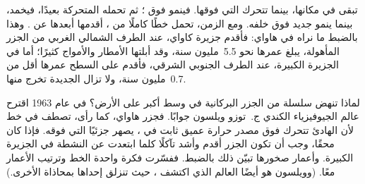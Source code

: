 تبقى  في مكانها، بينما تتحرك  التي فوقها. فينمو 
فوق ؛ ثم تحمله  المتحركة بعيدًا، فيخمد،
بينما ينمو  جديد فوق  خلفه. ومع الزمن، تحمل
 خطًا كاملًا من ، أقدمها أبعدها عن
. وهذا بالضبط ما نراه في هاواي: فأقدم 
جزيرة كاواي، عند الطرف الشمالي الغربي من الجزر المأهولة، يبلغ عمرها نحو
5.5~مليون سنة، وقد أبلتها الأمطار والأمواج كثيرًا؛ أما في الجزيرة
الكبيرة، عند الطرف الجنوبي الشرقي، فأقدم  على السطح عمرها أقل
من 0.7~مليون سنة، ولا تزال  الجديدة تخرج منها.

\begin{history}
لماذا تنهض سلسلة من الجزر البركانية في وسط أكبر
 على الأرض؟ في عام 1963 اقترح عالم الجيوفيزياء الكندي ج.~توزو ويلسون
جوابًا. فجزر هاواي، كما رأى، تصطف في خط لأن
  الهادئ تتحرك فوق مصدر حرارة عميق ثابت في ،
يصهر جزئيًا  التي فوقه. فإذا كان محقًا، وجب أن تكون الجزر
أقدم وأشد تآكلًا كلما ابتعدت عن  النشطة في
الجزيرة الكبيرة. وأعمار صخورها تبيّن ذلك بالضبط. ففسّرت فكرة واحدة الخط وترتيب الأعمار معًا.
(وويلسون هو أيضًا العالم الذي اكتشف ،
حيث تنزلق  إحداها بمحاذاة الأخرى.)
\end{history}


